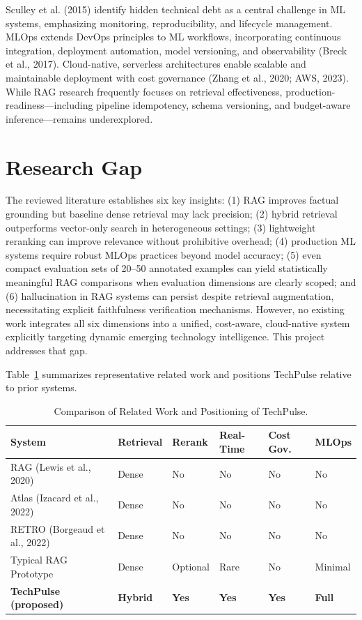\documentclass[12pt,a4paper]{report}
\begin{document}
Sculley et al. (2015) identify hidden technical debt as a central challenge in ML systems, emphasizing monitoring, reproducibility, and lifecycle management. MLOps extends DevOps principles to ML workflows, incorporating continuous integration, deployment automation, model versioning, and observability (Breck et al., 2017). Cloud-native, serverless architectures enable scalable and maintainable deployment with cost governance (Zhang et al., 2020; AWS, 2023). While RAG research frequently focuses on retrieval effectiveness, production-readiness—including pipeline idempotency, schema versioning, and budget-aware inference—remains underexplored.

\section{Research Gap}
\label{sec:gap}

The reviewed literature establishes six key insights: (1) RAG improves factual grounding but baseline dense retrieval may lack precision; (2) hybrid retrieval outperforms vector-only search in heterogeneous settings; (3) lightweight reranking can improve relevance without prohibitive overhead; (4) production ML systems require robust MLOps practices beyond model accuracy; (5) even compact evaluation sets of 20--50 annotated examples can yield statistically meaningful RAG comparisons when evaluation dimensions are clearly scoped; and (6) hallucination in RAG systems can persist despite retrieval augmentation, necessitating explicit faithfulness verification mechanisms. However, no existing work integrates all six dimensions into a unified, cost-aware, cloud-native system explicitly targeting dynamic emerging technology intelligence. This project addresses that gap.

Table~\ref{tab:related_work} summarizes representative related work and positions TechPulse relative to prior systems.

\begin{table}[H]
\caption{Comparison of Related Work and Positioning of TechPulse.}
\label{tab:related_work}
\centering
\begin{tabular}{p{2.8cm}p{2.2cm}p{1.6cm}p{2.0cm}p{1.7cm}p{1.5cm}}
\toprule
\textbf{System} & \textbf{Retrieval} & \textbf{Rerank} & \textbf{Real-Time} & \textbf{Cost Gov.} & \textbf{MLOps} \\
\midrule
RAG (Lewis et al., 2020) & Dense & No & No & No & No \\
Atlas (Izacard et al., 2022) & Dense & No & No & No & No \\
RETRO (Borgeaud et al., 2022) & Dense & No & No & No & No \\
Typical RAG Prototype & Dense & Optional & Rare & No & Minimal \\
\textbf{TechPulse (proposed)} & \textbf{Hybrid} & \textbf{Yes} & \textbf{Yes} & \textbf{Yes} & \textbf{Full} \\
\bottomrule
\end{tabular}
\end{table}
\end{document}
